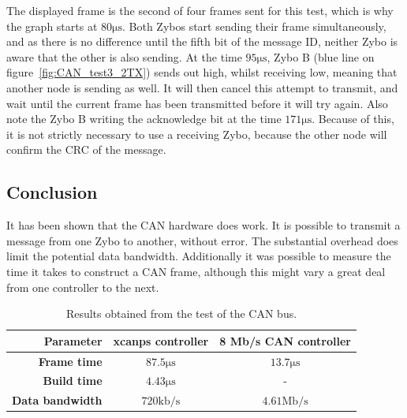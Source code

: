 The displayed frame is the second of four frames sent for this test, which is why the graph starts at $80 \si{\micro\second}$.
Both Zybos start sending their frame simultaneously, and as there is no difference until the fifth bit of the message ID, neither Zybo is aware that the other is also sending.
At the time $95\si{\micro\second}$, Zybo B (blue line on figure~\ref{fig:CAN_test3_2TX}) sends out high, whilst receiving low, meaning that another node is sending as well. 
It will then cancel this attempt to transmit, and wait until the current frame has been transmitted before it will try again.
Also note the Zybo B writing the acknowledge bit at the time $171 \si{\micro\second}$.
Because of this, it is not strictly necessary to use a receiving Zybo, because the other node will confirm the CRC of the message.\\

\subsection{Conclusion}\label{sub:CAN_test_conclusion}
It has been shown that the CAN hardware does work.
It is possible to transmit a message from one Zybo to another, without error.
The substantial overhead does limit the potential data bandwidth.
Additionally it was possible to measure the time it takes to construct a CAN frame, although this might vary a great deal from one controller to the next.

\begin{table}[h!]
	\centering
	\begin{tabular}{r | c | c}
		\textbf{Parameter} & \textbf{xcanps controller} & \textbf{8 Mb/s CAN controller} \\
		\hline
		\textbf{Frame time} & $87.5 \si{\micro\second}$ & $13.7\si{\micro\second}$ \\
		\textbf{Build time} & $4.43 \si{\micro\second}$ & - \\
		\textbf{Data bandwidth} & $720 \mathrm{kb/s}$ & $4.61 \mathrm{Mb/s}$
	\end{tabular}
	\caption{Results obtained from the test of the CAN bus.}
	\label{tab:CAN_test_conclusion}
\end{table}
